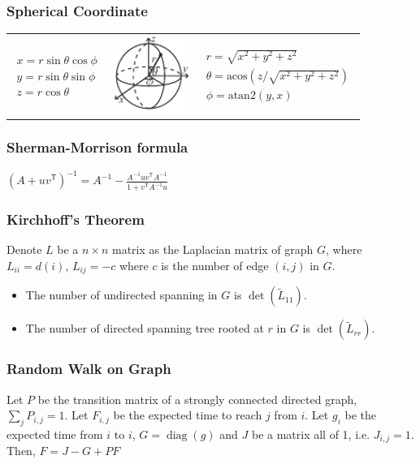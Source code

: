 \vspace{-0.5em}
\subsubsection{Spherical Coordinate}
{
\centering
\begin{tabular}{ccc}
{$\begin{aligned}
  x = r\sin\theta\cos\phi \\
  y = r\sin\theta\sin\phi \\
  z = r\cos\theta
\end{aligned}$}
&
\includegraphics[width=25mm]{../codes/Misc/sphericalCoordinates.pdf}
&
{$\begin{aligned}
  r = \sqrt{x^2+y^2+z^2} \\
  \theta = \textrm{acos}(z/\sqrt{x^2+y^2+z^2}) \\
  \phi = \textrm{atan2}(y,x)
\end{aligned}$}
\end{tabular}
}

\subsubsection{Sherman-Morrison formula}
$\left(A + uv^\textsf{T}\right)^{-1} = A^{-1} - \frac{A^{-1}uv^\textsf{T}A^{-1}}{1 + v^\textsf{T}A^{-1}u}$

\subsubsection{Kirchhoff's Theorem}
Denote $L$ be a $n \times n$ matrix as the Laplacian matrix of graph $G$, where $L_{ii} = d(i)$, $L_{ij} = -c$ where $c$ is the number of edge $(i, j)$ in $G$.
\begin{itemize}
    \item The number of undirected spanning in $G$ is $\det(\tilde{L}_{11})$.
    \item The number of directed spanning tree rooted at $r$ in $G$ is $\det(\tilde{L}_{rr})$.
\end{itemize}

\subsubsection{Random Walk on Graph}
Let $P$ be the transition matrix of a strongly connected directed graph, $\sum _ j P_{i,j} = 1$.
Let $F_{i,j}$ be the expected time to reach $j$ from $i$.
Let $g_i$ be the expected time from $i$ to $i$, $G = \operatorname{diag}(g)$
and $J$ be a matrix all of 1, i.e. $J_{i,j} = 1$.
Then, $F = J - G + PF$

